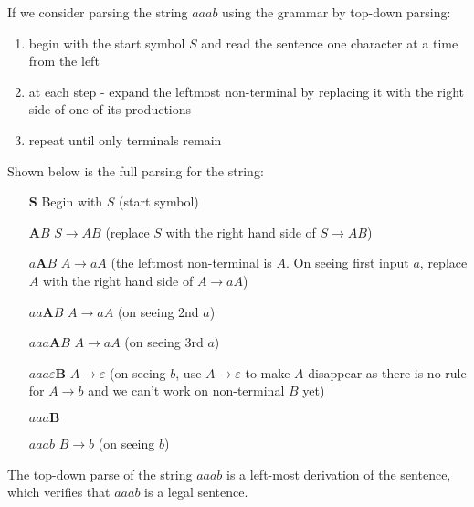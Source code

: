 If we consider parsing the string $aaab$ using the grammar by top-down parsing:
\begin{enumerate}
    \item begin with the start symbol $S$ and read the sentence one character at a time from the left
    \item at each step - expand the leftmost non-terminal by replacing it with the right side of one of its productions
    \item repeat until only terminals remain
\end{enumerate}
Shown below is the full parsing for the string:
\begin{itemize}
    \setlength{\itemindent}{2em}
    \item[$\boldsymbol{S}$] Begin with $S$ (start symbol)
    \item[$\boldsymbol{A}B$] $S \rightarrow AB$ (replace $S$ with the right hand side of $S \rightarrow AB$)
    \item[$a\boldsymbol{A}B$] $A \rightarrow aA$ (the leftmost non-terminal is $A$. On seeing first input $a$, replace $A$ with the right hand side of $A \rightarrow aA$)
    \item[$aa\boldsymbol{A}B$] $A\rightarrow aA$ (on seeing 2nd $a$)
    \item[$aaa\boldsymbol{A}B$] $A \rightarrow aA$ (on seeing 3rd $a$)
    \item[$aaa\varepsilon\boldsymbol{B}$] $A \rightarrow \varepsilon$ (on seeing $b$, use $A \rightarrow \varepsilon$ to make $A$ disappear as there is no rule for $A \rightarrow b$ and we can't work on non-terminal $B$ yet)   
    \item[$aaa\boldsymbol{B}$] 
    \item[$aaab$] $B \rightarrow b$ (on seeing $b$)
\end{itemize}

The top-down parse of the string $aaab$ is a left-most derivation of the sentence, which verifies that $aaab$ is a legal sentence. \\

